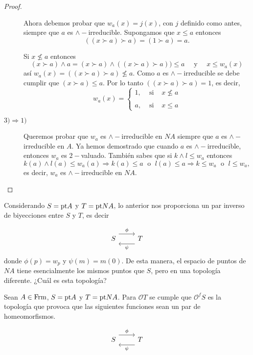 \begin{proof}
\begin{description}
        Ahora debemos probar que $w_a(x)=j(x)$, con $j$ definido como antes, siempre que $a$ es $\wedge-$irreducible. Supongamos que $x\leq a$ entonces 
        \[
        ((x\succ a)\succ a)=(1\succ a)=a.
        \]

        Si $x\nleq a$ entonces 
        \[
        (x\succ a)\wedge a=(x\succ a)\wedge ((x\succ a)\succ a))\leq a \quad\mbox{ y }\quad x\leq w_a(x)
        \]
        así $w_a(x)=((x\succ a)\succ a)\nleq a$. Como $a$ es $\wedge-$irreducible se debe cumplir que $(x\succ a)\leq a$. Por lo tanto $((x\succ a)\succ a)=1$, es decir,
        \[
        w_a(x)= \left\{ \begin{array}{lcc} 1, & \mbox{ si } & x \nleq a \\ \\  a, & \mbox{ si } & x \leq a \end{array} \right.
        \]
        
        \item[$3)\Rightarrow 1)$]  Queremos probar que $w_a$ es $\wedge-$irreducible en $NA$ siempre que $a$ es $\wedge-$irreducible en $A$. Ya hemos demostrado que cuando $a$ es $\wedge-$irreducible, entonces $w_a$ es $2-$valuado. También sabes que si $k\wedge l\leq w_a$ entonces 
        \[
        k(a)\wedge l(a)\leq w_a(a)\Rightarrow k(a)\leq a \;\mbox{ o } \;l(a)\leq a\Rightarrow k\leq w_a\;\mbox{ o }\;l\leq w_a,
        \]
        es decir, $w_a$ es $\wedge-$irreducible en $NA$.
    \end{description}
\end{proof}

Considerando $S=\mathrm{pt} A$ y $T=\mathrm{pt} NA$, lo anterior nos proporciona un par inverso de biyecciones entre $S$ y $T$, es decir

\[\begin{tikzcd}
	S & T
	\arrow["\phi", shift left=3, from=1-1, to=1-2]
	\arrow["\psi", shift left=3, from=1-2, to=1-1]
\end{tikzcd}\]
donde $\phi(p)=w_p$ y $\psi(m)=m(0)$. De esta manera, el espacio de puntos de $NA$ tiene esencialmente los mismos puntos que $S$, pero en una topología diferente. ¿Cuál es esta topología?

\begin{lem}\label{Lema6.4.3}
    Sean $A\in \mathrm{Frm}$, $S=\mathrm{pt} A$ y $T=\mathrm{pt} NA$. Para $\mathcal{O}T$ se cumple que $\mathcal{O}^fS$ es la topología que provoca que las siguientes funciones sean un par de homeomorfismos.

\[\begin{tikzcd}
	S & T
	\arrow["\phi", shift left=3, from=1-1, to=1-2]
	\arrow["\psi", shift left=3, from=1-2, to=1-1]
\end{tikzcd}\]    
\end{lem}

